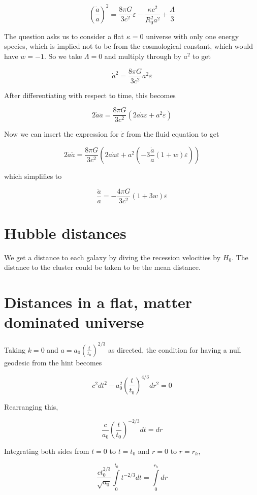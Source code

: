 \documentclass[12pt]{article}
\begin{document}
\[ \left(\frac{\dot{a}}{a}\right)^2 = \frac{8\pi G}{3c^2}\varepsilon - \frac{\kappa c^2}{R_0^2 a^2} +\frac{\Lambda}{3}
\]

The question asks us to consider a flat \(\kappa = 0\) universe with only one energy species, which is implied not to be from the cosmological constant, which would have \(w = -1\).  So we take \(\Lambda = 0\) and multiply through by \(a^2\) to get

\[\dot{a}^2 = \frac{8 \pi G}{3c^2}a^2\varepsilon
\]

After differentiating with respect to time, this becomes

\[ 2\dot{a}\ddot{a} = \frac{8 \pi G}{3c^2} (2a\dot{a}\varepsilon + a^2\dot{\varepsilon})
\]

Now we can insert the expression for \(\dot{\varepsilon}\) from the fluid equation to get

\[ 2\dot{a}\ddot{a} = \frac{8 \pi G}{3c^2} \left( 2a\dot{a}\varepsilon + a^2\left(-3\frac{\dot{a}}{a}(1+w)\varepsilon\right) \right)
\]

which simplifies to 

\[ \boxed{ \frac{\ddot{a}}{a} = -\frac{4\pi G}{3c^2}(1+3w)\varepsilon }
\]

\section{Hubble distances}

We get a distance to each galaxy by diving the recession velocities by \(H_0\). The distance to the cluster could be taken to be the mean distance.

\section{Distances in a flat, matter dominated universe}

Taking \(k=0\) and \(a = a_0\left(\frac{t}{t_0}\right)^{2/3}\) as directed, the condition for having a null geodesic from the hint becomes

\[ c^2dt^2 -  a_0^2\left(\frac{t}{t_0}\right)^{4/3}dr^2 = 0
\]

Rearranging this,

\[\frac{c}{a_0}\left(\frac{t}{t_0}\right)^{-2/3}dt = dr
\]

Integrating both sides from \(t=0\) to \(t=t_0\) and \(r=0\) to \(r=r_h\),

\[\frac{ct_0^{2/3}}{\sqrt{a_0}}\int\limits_0^{t_0}t^{-2/3}dt = \int\limits_0^{r_h}dr
\]
\end{document}
